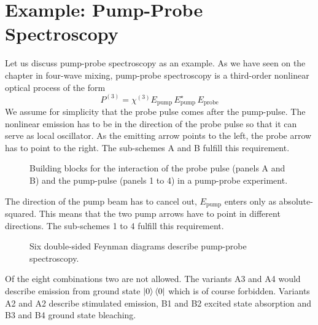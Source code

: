\section{Example: Pump-Probe Spectroscopy}

Let us discuss pump-probe spectroscopy as an example. As we have seen on the chapter in four-wave mixing, pump-probe spectroscopy is a third-order nonlinear optical process of the form
\begin{equation}
 P^{(3)} =  \chi^{(3)} E_\text{pump} \, E_\text{pump}^\star \, E_\text{probe}
\end{equation}
We assume for simplicity that the probe pulse comes after the pump-pulse. The nonlinear emission has to be in the direction of the probe pulse so that it can serve as local oscillator. As the emitting arrow points to the left, the probe arrow has to point to the right. The sub-schemes A and B fulfill this requirement.


\begin{figure}

\caption{
Building blocks for the interaction of the probe pulse (panels A and B) and the pump-pulse (panels 1 to 4) in a pump-probe experiment.}
\label{fig_2d_f2}
\end{figure}

The direction of the pump beam has to cancel out, $E_\text{pump} $ enters only as absolute-squared. This means that the two pump arrows have to point in different directions. The sub-schemes 1 to 4 fulfill this requirement.

\begin{figure}

\caption{
Six double-sided Feynman diagrams describe pump-probe spectroscopy.}
\label{fig_2d_f3}
\end{figure}

Of the eight combinations two are not allowed. The variants A3 and A4 would describe  emission from ground state  $\ket{0} \bra{0}$ which is of course forbidden. Variants A2 and A2 describe stimulated emission, B1 and B2 excited state absorption and B3 and B4 ground state bleaching.

